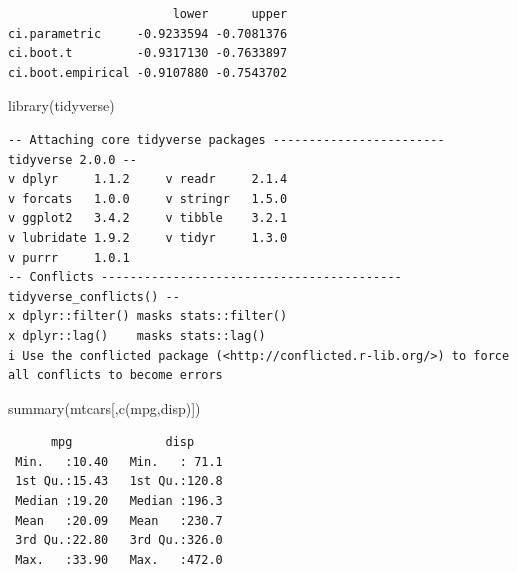 \documentclass[
  letterpaper,
  DIV=11,
  numbers=noendperiod]{scrreport}
\newenvironment{Shaded}{\begin{snugshade}}{\end{snugshade}}
\newcommand{\FunctionTok}[1]{\textcolor[rgb]{0.28,0.35,0.67}{#1}}
\newcommand{\NormalTok}[1]{\textcolor[rgb]{0.00,0.23,0.31}{#1}}
\newcommand{\StringTok}[1]{\textcolor[rgb]{0.13,0.47,0.30}{#1}}
\begin{document}
\begin{verbatim}
                       lower      upper
ci.parametric     -0.9233594 -0.7081376
ci.boot.t         -0.9317130 -0.7633897
ci.boot.empirical -0.9107880 -0.7543702
\end{verbatim}

\begin{Shaded}
\begin{Highlighting}[]
\FunctionTok{library}\NormalTok{(tidyverse)}
\end{Highlighting}
\end{Shaded}

\begin{verbatim}
-- Attaching core tidyverse packages ------------------------ tidyverse 2.0.0 --
v dplyr     1.1.2     v readr     2.1.4
v forcats   1.0.0     v stringr   1.5.0
v ggplot2   3.4.2     v tibble    3.2.1
v lubridate 1.9.2     v tidyr     1.3.0
v purrr     1.0.1     
-- Conflicts ------------------------------------------ tidyverse_conflicts() --
x dplyr::filter() masks stats::filter()
x dplyr::lag()    masks stats::lag()
i Use the conflicted package (<http://conflicted.r-lib.org/>) to force all conflicts to become errors
\end{verbatim}

\begin{Shaded}
\begin{Highlighting}[]
\FunctionTok{summary}\NormalTok{(mtcars[,}\FunctionTok{c}\NormalTok{(}\StringTok{\textquotesingle{}mpg\textquotesingle{}}\NormalTok{,}\StringTok{\textquotesingle{}disp\textquotesingle{}}\NormalTok{)])}
\end{Highlighting}
\end{Shaded}

\begin{verbatim}
      mpg             disp      
 Min.   :10.40   Min.   : 71.1  
 1st Qu.:15.43   1st Qu.:120.8  
 Median :19.20   Median :196.3  
 Mean   :20.09   Mean   :230.7  
 3rd Qu.:22.80   3rd Qu.:326.0  
 Max.   :33.90   Max.   :472.0  
\end{verbatim}
\end{document}

